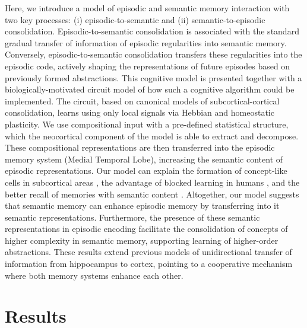 \documentclass{article}
\begin{document}
Here, we introduce a model of episodic and semantic memory interaction with two key processes: (i) episodic-to-semantic and (ii) semantic-to-episodic consolidation. Episodic-to-semantic consolidation is associated with the standard gradual transfer of information of episodic regularities into semantic memory. Conversely, episodic-to-semantic consolidation transfers these regularities into the episodic code, actively shaping the representations of future episodes based on previously formed abstractions. This cognitive model is presented together with a biologically-motivated circuit model of how such a cognitive algorithm could be implemented. The circuit, based on canonical models of subcortical-cortical consolidation, learns using only local signals via Hebbian and homeostatic plasticity. We use compositional input with a pre-defined statistical structure, which the neocortical component of the model is able to extract and decompose. These compositional representations are then transferred into the episodic memory system (Medial Temporal Lobe), increasing the semantic content of episodic representations. Our model can explain the formation of concept-like cells in subcortical areas , the advantage of blocked learning in humans , and the better recall of memories with semantic content . Altogether, our model suggests that semantic memory can enhance episodic memory by transferring into it semantic representations. Furthermore, the presence of these semantic representations in episodic encoding facilitate the consolidation of concepts of higher complexity in semantic memory, supporting learning of higher-order abstractions. These results extend previous models of unidirectional transfer of information from hippocampus to cortex, pointing to a cooperative mechanism where both memory systems enhance each other.  
\newpage
\section*{Results}
\end{document}
